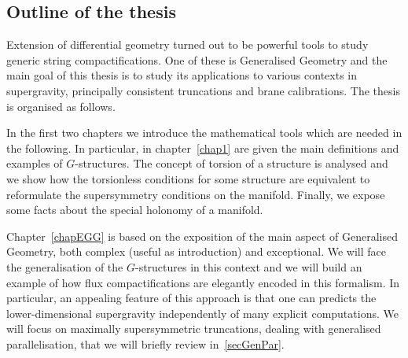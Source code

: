 \documentclass[draft]{phd}
\begin{document}
%		


\subsection*{Outline of the thesis}
		
			Extension of differential geometry turned out to be powerful tools to study generic string compactifications. 
			One of these is Generalised Geometry and the main goal of this thesis is to study its applications to various contexts in supergravity, principally consistent truncations and brane calibrations.
			The thesis is organised as follows.
			
			In the first two chapters we introduce the mathematical tools which are needed in the following.
			In particular, in chapter~\ref{chap1} are given the main definitions and examples of $G$-structures. 
			The concept of torsion of a structure is analysed and we show how the torsionless conditions for some structure are equivalent to reformulate the supersymmetry conditions on the manifold.
			Finally, we expose some facts about the special holonomy of a manifold.
			
			Chapter~\ref{chapEGG} is based on the exposition of the main aspect of Generalised Geometry, both complex (useful as introduction) and exceptional.
			We will face the generalisation of the $G$-structures in this context and we will build an example of how flux compactifications are elegantly encoded in this formalism.
			In particular, an appealing feature of this approach is that one can predicts the lower-dimensional supergravity independently of many explicit computations.
			We will focus on maximally supersymmetric truncations, dealing with generalised parallelisation, that we will briefly review in~\ref{secGenPar}.
			
\end{document}
